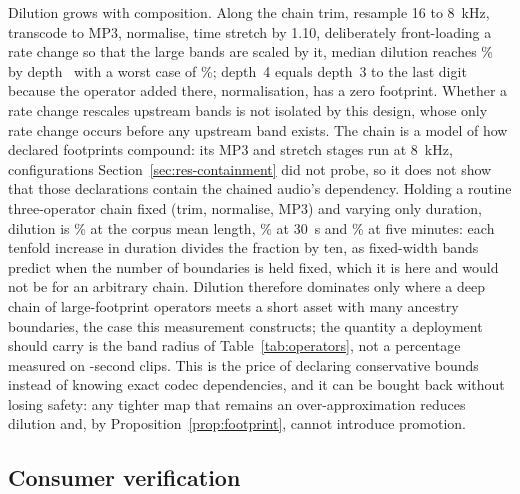 \documentclass[preprint,3p,11pt,authoryear]{elsarticle}
\begin{document}
Dilution grows with composition. Along the chain trim, resample 16 to
8~kHz, transcode to MP3, normalise, time stretch by 1.10, deliberately
front-loading a rate change so that the large bands are scaled by it, median
dilution reaches \IchainDeep{}\% by depth~\IchainDepth{} with a worst case of
\IchainDeepMax{}\%; depth~4 equals depth~3 to the last digit because the
operator added there, normalisation, has a zero footprint. Whether a rate change rescales upstream bands is not isolated by this design,
whose only rate change occurs before any upstream band exists. The chain is a
model of how declared footprints compound: its MP3 and stretch stages run at
8~kHz, configurations Section~\ref{sec:res-containment} did not probe, so it does
not show that those declarations contain the chained audio's dependency.
Holding a routine three-operator chain fixed (trim,
normalise, MP3) and varying only duration, dilution is \IlongShortPct{}\% at
the corpus mean length, \IlongThirtyPct{}\% at 30~s and
\IlongThreeHundredPct{}\% at five minutes: each tenfold increase in duration
divides the fraction by ten, as fixed-width bands predict when the number of
boundaries is held fixed, which it is here and would not be for an arbitrary
chain. Dilution therefore dominates only where a deep chain of large-footprint
operators meets a short asset with many ancestry boundaries, the case this measurement
constructs; the quantity a deployment should carry is
the band radius of Table~\ref{tab:operators}, not a percentage measured on
\CmeanDurS{}-second clips. This is the price of declaring conservative bounds
instead of knowing exact codec dependencies, and it can be bought back without
losing safety: any tighter map that remains an over-approximation reduces
dilution and, by Proposition~\ref{prop:footprint}, cannot introduce
promotion.

\begin{table}[t]
\centering
\caption{Claim dilution: the fraction of output samples whose footprint-aware
evidence is strictly weaker than the evidence over the nominal represented
content, per transformation over \IclipsPerTf{} clips and along a composition
chain over \IchainClips{} clips. This is the price of the declared footprints,
which combine analytical support with implementation margin, when the nominal map
is exact.}
\label{tab:dilution}
\small

\end{table}

\subsection{Consumer verification}
\label{sec:res-consumer}
\end{document}
